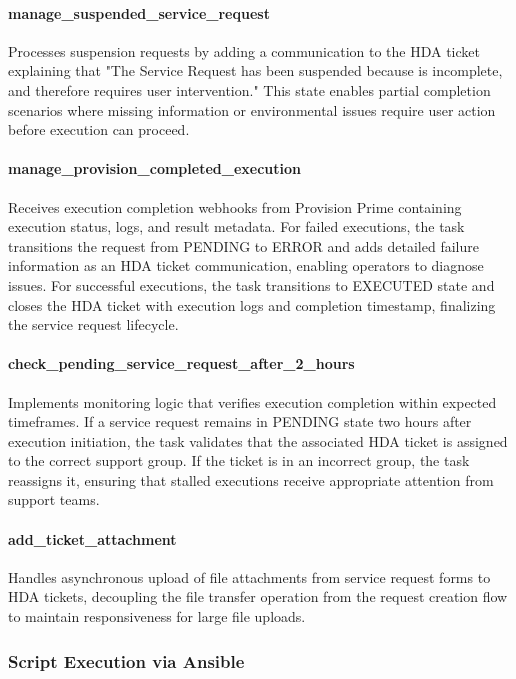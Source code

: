 \paragraph{manage\_suspended\_service\_request}
Processes suspension requests by adding a communication to the HDA ticket explaining that "The Service Request has been suspended because is incomplete, and therefore requires user intervention." This state enables partial completion scenarios where missing information or environmental issues require user action before execution can proceed.

\paragraph{manage\_provision\_completed\_execution}
Receives execution completion webhooks from Provision Prime containing execution status, logs, and result metadata. For failed executions, the task transitions the request from PENDING to ERROR and adds detailed failure information as an HDA ticket communication, enabling operators to diagnose issues. For successful executions, the task transitions to EXECUTED state and closes the HDA ticket with execution logs and completion timestamp, finalizing the service request lifecycle.

\paragraph{check\_pending\_service\_request\_after\_2\_hours}
Implements monitoring logic that verifies execution completion within expected timeframes. If a service request remains in PENDING state two hours after execution initiation, the task validates that the associated HDA ticket is assigned to the correct support group. If the ticket is in an incorrect group, the task reassigns it, ensuring that stalled executions receive appropriate attention from support teams.

\paragraph{add\_ticket\_attachment}
Handles asynchronous upload of file attachments from service request forms to HDA tickets, decoupling the file transfer operation from the request creation flow to maintain responsiveness for large file uploads.

\subsubsection{Script Execution via Ansible}

